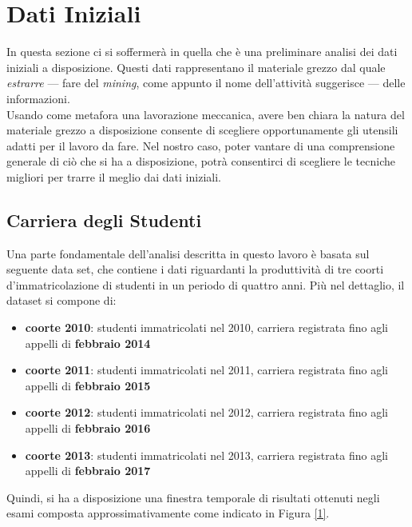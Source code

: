 \chapter{Dati Iniziali}
\label{ch:rawd}

In questa sezione ci si soffermerà in quella che è una preliminare analisi dei dati iniziali a disposizione. Questi dati rappresentano il materiale grezzo dal quale \textit{estrarre} --- fare del \textit{mining}, come appunto il nome dell'attività suggerisce --- delle informazioni. \\

Usando come metafora una lavorazione meccanica, avere ben chiara la natura del materiale grezzo a disposizione consente di scegliere opportunamente gli utensili adatti per il lavoro da fare. Nel nostro caso, poter vantare di una comprensione generale di ciò che si ha a disposizione, potrà consentirci di scegliere le tecniche migliori per trarre il meglio dai dati iniziali. \\

\section{Carriera degli Studenti}

Una parte fondamentale dell'analisi descritta in questo lavoro è basata sul seguente data set, che contiene i dati riguardanti la produttività di tre coorti d'immatricolazione di studenti in un periodo di quattro anni. Più nel dettaglio, il dataset si compone di:

\begin{itemize}
	\item \textbf{coorte 2010}: studenti immatricolati nel 2010, carriera registrata fino agli appelli di \textbf{febbraio 2014}
	\item \textbf{coorte 2011}: studenti immatricolati nel 2011, carriera registrata fino agli appelli di \textbf{febbraio 2015}
	\item \textbf{coorte 2012}: studenti immatricolati nel 2012, carriera registrata fino agli appelli di \textbf{febbraio 2016}
	\item \textbf{coorte 2013}: studenti immatricolati nel 2013, carriera registrata fino agli appelli di \textbf{febbraio 2017}
\end{itemize}

Quindi, si ha a disposizione una finestra temporale di risultati ottenuti negli esami composta approssimativamente come indicato in Figura \ref{1}. \\

